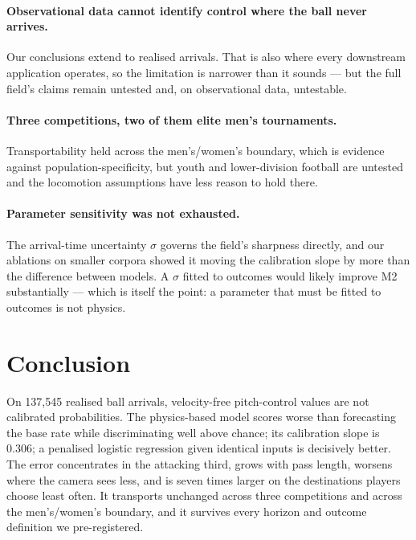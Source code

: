 \documentclass[11pt,a4paper]{article}
\begin{document}
\paragraph{Observational data cannot identify control where the ball never
arrives.} Our conclusions extend to realised arrivals. That is also where every
downstream application operates, so the limitation is narrower than it sounds ---
but the full field's claims remain untested and, on observational data,
untestable.

\paragraph{Three competitions, two of them elite men's tournaments.}
Transportability held across the men's/women's boundary, which is evidence
against population-specificity, but youth and lower-division football are
untested and the locomotion assumptions have less reason to hold there.

\paragraph{Parameter sensitivity was not exhausted.}
The arrival-time uncertainty $\sigma$ governs the field's sharpness directly, and
our ablations on smaller corpora showed it moving the calibration slope by more
than the difference between models. A $\sigma$ fitted to outcomes would likely
improve M2 substantially --- which is itself the point: a parameter that must be
fitted to outcomes is not physics.

\section{Conclusion}

On 137{,}545 realised ball arrivals, velocity-free pitch-control values are not
calibrated probabilities. The physics-based model scores worse than forecasting
the base rate while discriminating well above chance; its calibration slope is
0.306; a penalised logistic regression given identical inputs is decisively
better. The error concentrates in the attacking third, grows with pass length,
worsens where the camera sees less, and is seven times larger on the destinations
players choose least often. It transports unchanged across three competitions and
across the men's/women's boundary, and it survives every horizon and outcome
definition we pre-registered.
\end{document}
